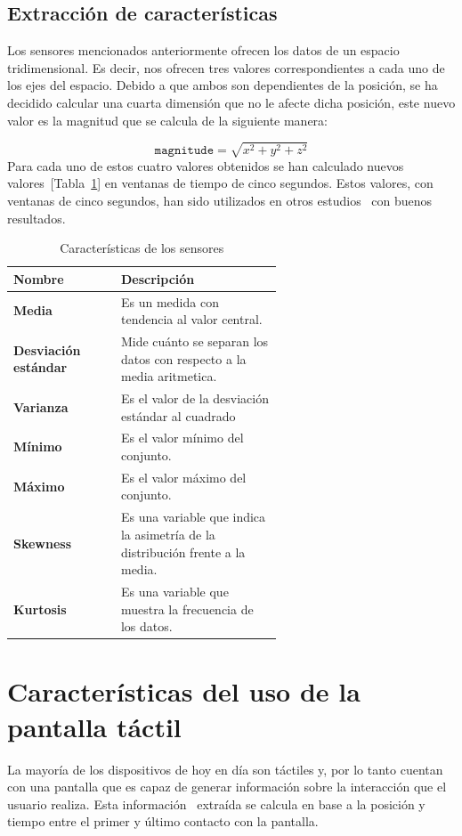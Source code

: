 \subsection{Extracción de características}
Los sensores mencionados anteriormente ofrecen los datos de un espacio tridimensional. Es decir, nos ofrecen tres valores correspondientes a cada uno de los ejes del espacio.
Debido a que ambos son dependientes de la posición, se ha decidido calcular una cuarta dimensión que no le afecte dicha posición, este nuevo valor es la magnitud que se calcula de la siguiente manera:

\begin{equation}
\texttt{magnitude} = \sqrt{ x^2 + y^2 + z^2}
\end{equation}
Para cada uno de estos cuatro valores obtenidos se han calculado nuevos valores~[Tabla~\ref{tab:sensor_features}] en ventanas de tiempo de cinco segundos. Estos valores, con ventanas de cinco segundos, han sido utilizados en otros estudios~\cite{ehatisham2018continuous} con buenos resultados. 

\begin{table}[H]
    \centering
    \begin{tabular}{l p{0.6\linewidth}}
    \toprule
    Nombre & Descripción \\
    \midrule
        \textbf{Media} &   Es un medida con tendencia al valor central. \\
        \textbf{Desviación estándar} &  Mide cuánto se separan los datos con respecto a la media aritmetica. \\
        \textbf{Varianza} &   Es el valor de la desviación estándar al cuadrado \\
        \textbf{Mínimo} &   Es el valor mínimo del conjunto. \\
        \textbf{Máximo} &   Es el valor máximo del conjunto. \\
        \textbf{Skewness} &   Es una variable que indica la asimetría de la distribución frente a la media. \\
        \textbf{Kurtosis} &   Es una variable que muestra la frecuencia de los datos. \\
    \bottomrule
    \end{tabular}
    \caption{Características de los sensores}
    \label{tab:sensor_features}
\end{table}

\section{Características del uso de la pantalla táctil}
La mayoría de los dispositivos de hoy en día son táctiles y, por lo tanto cuentan con una pantalla que es capaz de generar información sobre la interacción que el usuario realiza. Esta información~\cite{touch_events} extraída se calcula en base a la posición y tiempo entre el primer y último contacto con la pantalla.

